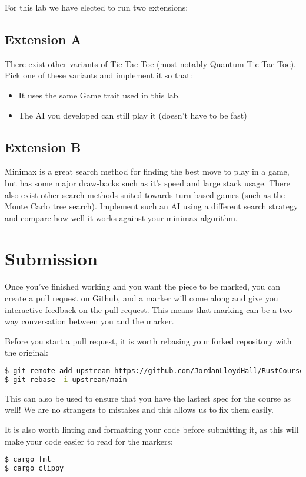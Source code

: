 \documentclass{report}
\begin{document}
For this lab we have elected to run two extensions:
\subsection*{Extension A}
There exist \href{https://en.wikipedia.org/wiki/Tic-tac-toe_variants}{other variants of Tic Tac Toe} (most notably \href{https://en.wikipedia.org/wiki/Quantum_tic-tac-toe}{Quantum Tic Tac Toe}).
Pick one of these variants and implement it so that:
\begin{itemize}
    \item It uses the same Game trait used in this lab.
    \item The AI you developed can still play it (doesn't have to be fast)
\end{itemize}

\subsection*{Extension B}
Minimax is a great search method for finding the best move to play in a game, but
has some major draw-backs such as it's speed and large stack usage. There also 
exist other search methods suited towards turn-based games (such as the \href{https://en.wikipedia.org/wiki/Monte_Carlo_tree_search}{Monte Carlo tree search}).
Implement such an AI using a different search strategy and compare how well it works
against your minimax algorithm.

\section*{Submission}
Once you've finished working and you want the piece to be marked, you can create 
a pull request on Github, and a marker will come along and give you interactive
feedback on the pull request. This means that marking can be a two-way conversation
between you and the marker.

Before you start a pull request, it is worth rebasing your forked repository with
the original:
\begin{lstlisting}[language=Bash]
$ git remote add upstream https://github.com/JordanLloydHall/RustCourse
$ git rebase -i upstream/main
\end{lstlisting}

This can also be used to ensure that you have the lastest spec for the course as well! 
We are no strangers to mistakes and this allows us to fix them easily.

It is also worth linting and formatting your code before submitting it, as this will make your code
easier to read for the markers:
\begin{lstlisting}[language=Bash]
$ cargo fmt
$ cargo clippy
\end{lstlisting}
\end{document}
